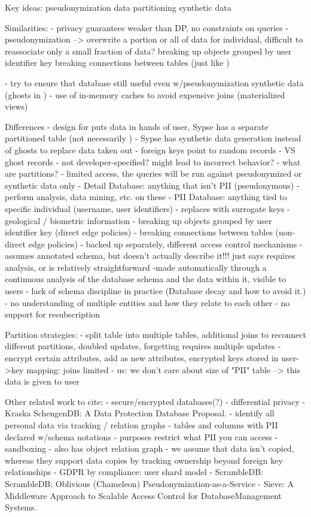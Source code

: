 
\iffalse
Key ideas:
    pseudonymization
    data partitioning
    synthetic data

Similarities:
- privacy guarantees weaker than DP, no constraints on queries
- pseudonymization --> overwrite a portion or all of data for individual, difficult to reassociate
    only a small fraction of data?
    breaking up objects grouped by user identifier key
    breaking connections between tables (just like )

- try to ensure that database still useful even w/pseudonymization
    synthetic data (ghosts in \name)
- use of in-memory caches to avoid expensive joins (materialized views)

Differences
- design for \name puts data in hands of user, Sypse has a separate partitioned table (not
necessarily )
- Sypse has synthetic data generation instead of ghosts to replace data taken out
    - foreign keys point to random records
    - VS ghost records
    - not developer-specified? might lead to incorrect behavior?
- what are partitions?
    - limited access, the queries will be run against pseudonymized or synthetic data only
    - Detail Database: anything that isn't PII (pseudonymous)
        - perform analysis, data mining, etc. on these
    - PII Database: anything tied to specific individual (username, user identifiers)
        - replaces with surrogate keys
        - geological / biometric information
        - breaking up objects grouped by user identifier key (direct edge policies)
        - breaking connections between tables (non-direct edge policies)
    - backed up separately, different access control mechanisms
- assumes annotated schema, but doesn't actually describe it!!! just says requires analysis, or is
relatively straightforward
    -made automatically through a continuous analysis of the database schema and the data within it,
    visible to users
    - lack of schema discipline in practice (Database decay and how to avoid it.)
    - no understanding of multiple entities and how they relate to each other
- no support for resubscription

Partition strategies:
- split table into multiple tables, additional joins to reconnect different partitions, doubled updates, forgetting requires multiple
updates
- encrypt certain attributes, add as new attributes, encrypted keys stored in user->key mapping: joins limited
- us: we don't care about size of "PII" table --> this data is given to user

Other related work to cite:
- secure/encrypted databases(?)
- differential privacy
- Kraska SchengenDB: A Data Protection Database Proposal.
    - identify all personal data via tracking / relation graphs
    - tables and columns with PII declared w/schema notations
    - purposes restrict what PII you can access
    - sandboxing
    - also has object relation graph
    - we assume that data isn't copied, whereas they support data copies by tracking ownership
    beyond foreign key relationships
- GDPR by compliance: user shard model
- ScrambleDB: ScrambleDB: Oblivious (Chameleon) Pseudonymization-as-a-Service
- Sieve: A Middleware Approach to Scalable Access Control for DatabaseManagement Systems.

